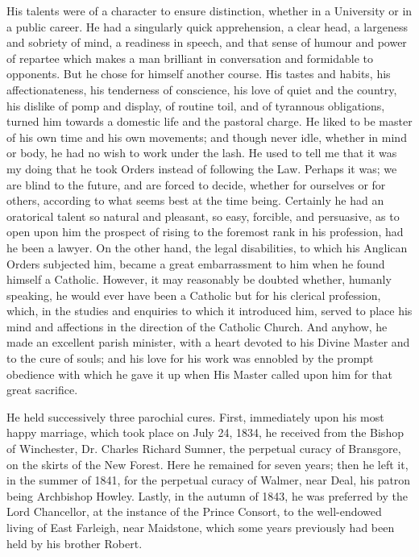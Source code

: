 His talents were of a character to ensure
distinction, whether in a University or in a public career. He had a
singularly quick apprehension, a clear head, a largeness and
sobriety of mind, a readiness in speech, and that sense of humour and
power of repartee which makes a man brilliant in conversation and
formidable to opponents. But he chose for himself another course. His
tastes and habits, his affectionateness, his tenderness of conscience,
his love of quiet and the country, his dislike of pomp and display, of
routine toil, and of tyrannous obligations, turned him towards a
domestic life and the pastoral charge. He liked to be master of his
own time and his own movements; and though never idle, whether in mind
or body, he had no wish to work under the lash. He used to tell me
that it was my doing that he took Orders instead of following the Law.
Perhaps it was; we are blind to the future, and are forced to decide,
whether for ourselves or for others, according to what seems best at
the time being. Certainly he had an oratorical talent so natural and
pleasant, so easy, forcible, and persuasive, as to open upon him the
prospect of rising to the foremost rank in his profession, had he been
a lawyer. On the other hand, the legal disabilities, to which his
Anglican Orders subjected him, became a great embarrassment to him
when he found himself a Catholic. However, it may reasonably be
doubted whether, humanly speaking, he would ever have been a Catholic
but for his clerical profession, which, in the studies and enquiries
to which it introduced him, served to place his mind and affections in
the direction of the Catholic Church. And anyhow, he made an excellent
parish minister, with a heart devoted to his Divine Master and to the
cure of souls; and his love for his work was ennobled by the
prompt obedience with which he gave it up when His Master called upon
him for that great sacrifice.

He held successively three parochial cures.
First, immediately upon his most happy marriage, which took place on
July 24, 1834, he received from the Bishop of Winchester, Dr. Charles
Richard Sumner, the perpetual curacy of Bransgore, on the skirts of
the New Forest. Here he remained for seven years; then he left it, in
the summer of 1841, for the perpetual curacy of Walmer, near Deal, his
patron being Archbishop Howley. Lastly, in the autumn of 1843, he was
preferred by the Lord Chancellor, at the instance of the Prince
Consort, to the well-endowed living of East Farleigh, near Maidstone,
which some years previously had been held by his brother Robert.

